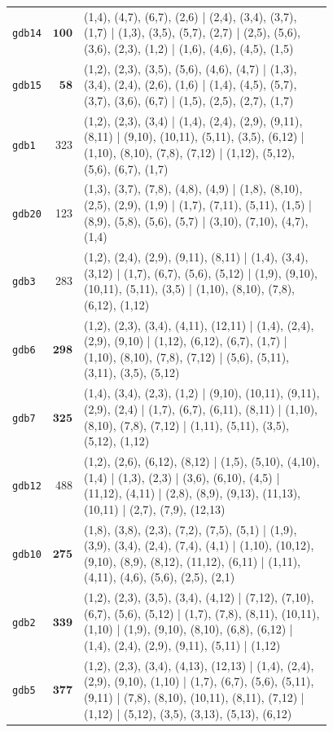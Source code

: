 \begin{landscape}
\begin{longtable}{lr>{\tiny\raggedright\arraybackslash}p{0.78\linewidth}}
\texttt{gdb14} & $\mathbf{100}$ & (1,4), (4,7), (6,7), (2,6) | (2,4), (3,4), (3,7), (1,7) | (1,3), (3,5), (5,7), (2,7) | (2,5), (5,6), (3,6), (2,3), (1,2) | (1,6), (4,6), (4,5), (1,5) \\[2pt]
\texttt{gdb15} & $\mathbf{58}$ & (1,2), (2,3), (3,5), (5,6), (4,6), (4,7) | (1,3), (3,4), (2,4), (2,6), (1,6) | (1,4), (4,5), (5,7), (3,7), (3,6), (6,7) | (1,5), (2,5), (2,7), (1,7) \\[2pt]
\texttt{gdb1} & 323 & (1,2), (2,3), (3,4) | (1,4), (2,4), (2,9), (9,11), (8,11) | (9,10), (10,11), (5,11), (3,5), (6,12) | (1,10), (8,10), (7,8), (7,12) | (1,12), (5,12), (5,6), (6,7), (1,7) \\[2pt]
\texttt{gdb20} & 123 & (1,3), (3,7), (7,8), (4,8), (4,9) | (1,8), (8,10), (2,5), (2,9), (1,9) | (1,7), (7,11), (5,11), (1,5) | (8,9), (5,8), (5,6), (5,7) | (3,10), (7,10), (4,7), (1,4) \\[2pt]
\texttt{gdb3} & 283 & (1,2), (2,4), (2,9), (9,11), (8,11) | (1,4), (3,4), (3,12) | (1,7), (6,7), (5,6), (5,12) | (1,9), (9,10), (10,11), (5,11), (3,5) | (1,10), (8,10), (7,8), (6,12), (1,12) \\[2pt]
\texttt{gdb6} & $\mathbf{298}$ & (1,2), (2,3), (3,4), (4,11), (12,11) | (1,4), (2,4), (2,9), (9,10) | (1,12), (6,12), (6,7), (1,7) | (1,10), (8,10), (7,8), (7,12) | (5,6), (5,11), (3,11), (3,5), (5,12) \\[2pt]
\texttt{gdb7} & $\mathbf{325}$ & (1,4), (3,4), (2,3), (1,2) | (9,10), (10,11), (9,11), (2,9), (2,4) | (1,7), (6,7), (6,11), (8,11) | (1,10), (8,10), (7,8), (7,12) | (1,11), (5,11), (3,5), (5,12), (1,12) \\[2pt]
\texttt{gdb12} & 488 & (1,2), (2,6), (6,12), (8,12) | (1,5), (5,10), (4,10), (1,4) | (1,3), (2,3) | (3,6), (6,10), (4,5) | (11,12), (4,11) | (2,8), (8,9), (9,13), (11,13), (10,11) | (2,7), (7,9), (12,13) \\[2pt]
\texttt{gdb10} & $\mathbf{275}$ & (1,8), (3,8), (2,3), (7,2), (7,5), (5,1) | (1,9), (3,9), (3,4), (2,4), (7,4), (4,1) | (1,10), (10,12), (9,10), (8,9), (8,12), (11,12), (6,11) | (1,11), (4,11), (4,6), (5,6), (2,5), (2,1) \\[2pt]
\texttt{gdb2} & $\mathbf{339}$ & (1,2), (2,3), (3,5), (3,4), (4,12) | (7,12), (7,10), (6,7), (5,6), (5,12) | (1,7), (7,8), (8,11), (10,11), (1,10) | (1,9), (9,10), (8,10), (6,8), (6,12) | (1,4), (2,4), (2,9), (9,11), (5,11) | (1,12) \\[2pt]
\texttt{gdb5} & $\mathbf{377}$ & (1,2), (2,3), (3,4), (4,13), (12,13) | (1,4), (2,4), (2,9), (9,10), (1,10) | (1,7), (6,7), (5,6), (5,11), (9,11) | (7,8), (8,10), (10,11), (8,11), (7,12) | (1,12) | (5,12), (3,5), (3,13), (5,13), (6,12) \\[2pt]

\end{longtable}
\end{landscape}
